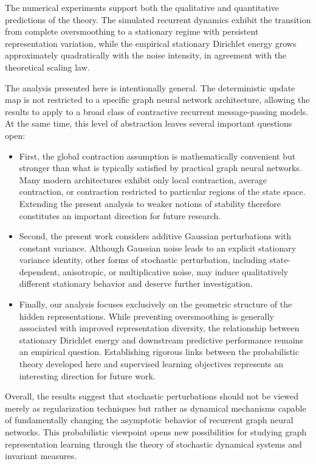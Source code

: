 \documentclass{article}
\begin{document}
The numerical experiments support both the qualitative and quantitative
predictions of the theory.
The simulated recurrent dynamics exhibit the transition from complete
oversmoothing to a stationary regime with persistent representation
variation, while the empirical stationary Dirichlet energy grows
approximately quadratically with the noise intensity, in agreement with
the theoretical scaling law.

The analysis presented here is intentionally general.
The deterministic update map is not restricted to a specific graph neural
network architecture, allowing the results to apply to a broad class of
contractive recurrent message-passing models.
At the same time, this level of abstraction leaves several important
questions open:
\begin{itemize}
\item 
First, the global contraction assumption is mathematically convenient but
stronger than what is typically satisfied by practical graph neural
networks.
Many modern architectures exhibit only local contraction, average
contraction, or contraction restricted to particular regions of the state
space.
Extending the present analysis to weaker notions of stability therefore
constitutes an important direction for future research.
\item 
Second, the present work considers additive Gaussian perturbations with
constant variance.
Although Gaussian noise leads to an explicit stationary variance identity,
other forms of stochastic perturbation, including state-dependent,
anisotropic, or multiplicative noise, may induce qualitatively different
stationary behavior and deserve further investigation.
\item 
Finally, our analysis focuses exclusively on the geometric structure of
the hidden representations.
While preventing oversmoothing is generally associated with improved
representation diversity, the relationship between stationary Dirichlet
energy and downstream predictive performance remains an empirical
question.
Establishing rigorous links between the probabilistic theory developed
here and supervised learning objectives represents an interesting
direction for future work.
\end{itemize}

Overall, the results suggest that stochastic perturbations should not be
viewed merely as regularization techniques but rather as dynamical
mechanisms capable of fundamentally changing the asymptotic behavior of
recurrent graph neural networks.
This probabilistic viewpoint opens new possibilities for studying graph
representation learning through the theory of stochastic dynamical systems
and invariant measures.
\end{document}
